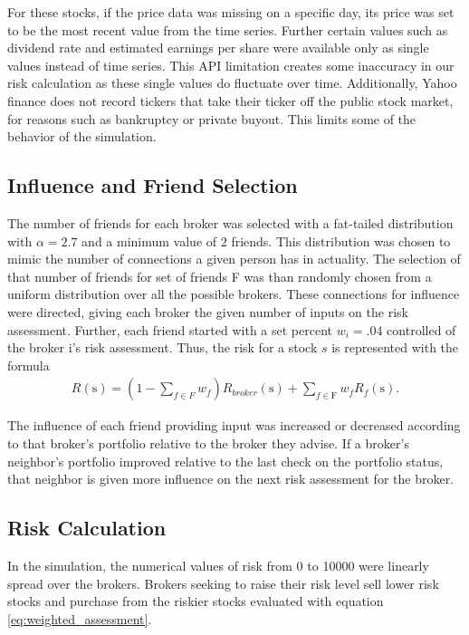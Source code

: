 \documentclass[letterpaper, 11 pt, proceedings]{IEEEtran}
\begin{document}
	For these stocks, if the price data was missing on a specific day, its price was set to be the most recent value from the time series. Further certain values such as dividend rate and estimated earnings per share were available only as single values instead of time series. This API limitation creates some inaccuracy in our risk calculation as these single values do fluctuate over time. Additionally, Yahoo finance does not record tickers that take their ticker off the public stock market, for reasons such as bankruptcy or private buyout. This limits some of the behavior of the simulation.  
	

	\subsection{Influence and Friend Selection}\label{subsec:friends}
	The number of friends for each broker was selected with a fat-tailed distribution with $\alpha = 2.7$ and a minimum value of $2$ friends. This distribution was chosen to mimic the number of connections a given person has in actuality. The selection of that number of friends for set of friends F was than randomly chosen from a uniform distribution over all the possible brokers. These connections for influence were directed, giving each broker the given number of inputs on the risk assessment. Further, each friend started with a set percent $w_i = .04$ controlled of the broker i's risk assessment. Thus, the risk for a stock $s$ is represented with the formula 
	\begin{align}
		R(\text{s}) = (1-\sum\limits_{f\in F} w_f) R_{broker}(\text{s}) + \sum\limits_{f\in \text{F}} w_f R_f(\text{s}).\label{eq:weighted_assessment}
	\end{align}	
	
	The influence of each friend providing input was increased or decreased according to that broker's portfolio relative to the broker they advise. If a broker's neighbor's portfolio improved relative to the last check on the portfolio status, that neighbor is given more influence on the next risk assessment for the broker.

	\subsection{Risk Calculation}\label{subsec:risk}
	
	
	In the simulation, the numerical values of risk from 0 to 10000 were linearly spread over the brokers. Brokers seeking to raise their risk level sell lower risk stocks and purchase from the riskier stocks evaluated with equation \ref{eq:weighted_assessment}.
	
\end{document}

